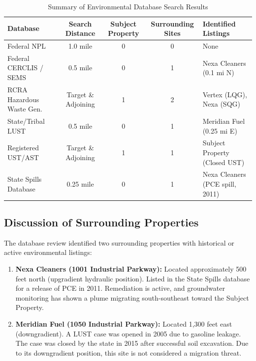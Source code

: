 \begin{table}[h]
\centering
\caption{Summary of Environmental Database Search Results}
\begin{tabularx}{\textwidth}{X c c c p{4.5cm}}
\toprule
\textbf{Database} & \textbf{Search Distance} & \textbf{Subject Property} & \textbf{Surrounding Sites} & \textbf{Identified Listings} \\
\midrule
Federal NPL & 1.0 mile & 0 & 0 & None \\
Federal CERCLIS / SEMS & 0.5 mile & 0 & 1 & Nexa Cleaners (0.1 mi N) \\
RCRA Hazardous Waste Gen. & Target \& Adjoining & 1 & 2 & Vertex (LQG), Nexa (SQG) \\
State/Tribal LUST & 0.5 mile & 0 & 1 & Meridian Fuel (0.25 mi E) \\
Registered UST/AST & Target \& Adjoining & 1 & 1 & Subject Property (Closed UST) \\
State Spills Database & 0.25 mile & 0 & 1 & Nexa Cleaners (PCE spill, 2011) \\
\bottomrule
\end{tabularx}
\label{tab:databases}
\end{table}

\subsection{Discussion of Surrounding Properties}
The database review identified two surrounding properties with historical or active environmental listings:
\begin{enumerate}
  \item \textbf{Nexa Cleaners (1001 Industrial Parkway):} Located approximately 500 feet north (upgradient hydraulic position). Listed in the State Spills database for a release of PCE in 2011. Remediation is active, and groundwater monitoring has shown a plume migrating south-southeast toward the Subject Property.
  \item \textbf{Meridian Fuel (1050 Industrial Parkway):} Located 1,300 feet east (downgradient). A LUST case was opened in 2005 due to gasoline leakage. The case was closed by the state in 2015 after successful soil excavation. Due to its downgradient position, this site is not considered a migration threat.
\end{enumerate}

